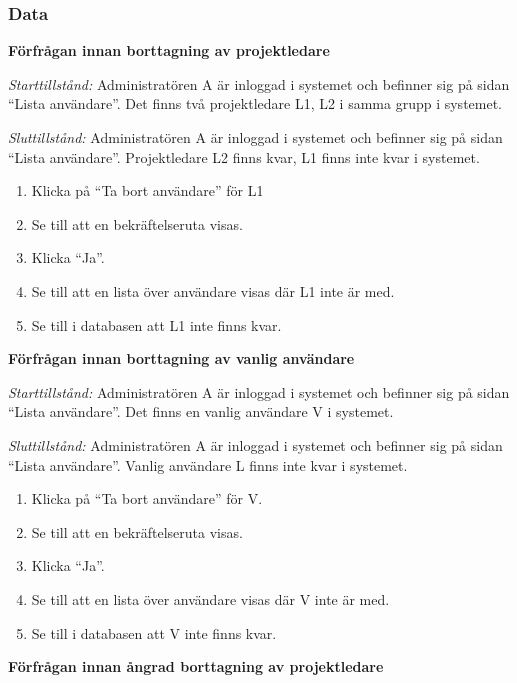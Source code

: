 \documentclass[a4paper]{article}
\begin{document}
\subsubsection{Data}
\begin{FT}
\item \textbf{Förfrågan innan borttagning av projektledare}

\emph{Starttillstånd:} Administratören A är inloggad i systemet och befinner sig på sidan ``Lista användare''. Det finns två projektledare L1, L2 i samma grupp i systemet.

\emph{Sluttillstånd:} Administratören A är inloggad i systemet och befinner sig på sidan ``Lista användare''. Projektledare L2 finns kvar, L1 finns inte kvar i systemet.

\begin{enumerate}
\item Klicka på ``Ta bort användare'' för L1
\item Se till att en bekräftelseruta visas.
\item Klicka ``Ja''.
\item Se till att en lista över användare visas där L1 inte är med.
\item Se till i databasen att L1 inte finns kvar.
\end{enumerate}

\item \textbf{Förfrågan innan borttagning av vanlig användare}

\emph{Starttillstånd:} Administratören A är inloggad i systemet och befinner sig på sidan ``Lista användare''. Det finns en vanlig användare V i systemet.

\emph{Sluttillstånd:} Administratören A är inloggad i systemet och befinner sig på sidan ``Lista användare''. Vanlig användare L finns inte kvar i systemet.

\begin{enumerate}
\item Klicka på ``Ta bort användare'' för V.
\item Se till att en bekräftelseruta visas.
\item Klicka ``Ja''.
\item Se till att en lista över användare visas där V inte är med.
\item Se till i databasen att V inte finns kvar.
\end{enumerate}

\item \textbf{Förfrågan innan ångrad borttagning av projektledare}


\end{FT}
\end{document}
